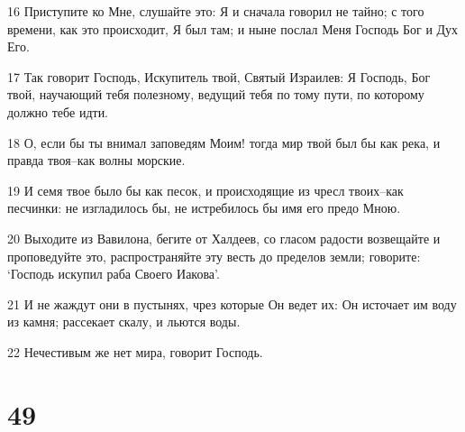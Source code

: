 \par 16 Приступите ко Мне, слушайте это: Я и сначала говорил не тайно; с того времени, как это происходит, Я был там; и ныне послал Меня Господь Бог и Дух Его.
\par 17 Так говорит Господь, Искупитель твой, Святый Израилев: Я Господь, Бог твой, научающий тебя полезному, ведущий тебя по тому пути, по которому должно тебе идти.
\par 18 О, если бы ты внимал заповедям Моим! тогда мир твой был бы как река, и правда твоя--как волны морские.
\par 19 И семя твое было бы как песок, и происходящие из чресл твоих--как песчинки: не изгладилось бы, не истребилось бы имя его предо Мною.
\par 20 Выходите из Вавилона, бегите от Халдеев, со гласом радости возвещайте и проповедуйте это, распространяйте эту весть до пределов земли; говорите: `Господь искупил раба Своего Иакова'.
\par 21 И не жаждут они в пустынях, чрез которые Он ведет их: Он источает им воду из камня; рассекает скалу, и льются воды.
\par 22 Нечестивым же нет мира, говорит Господь.

\chapter{49}

